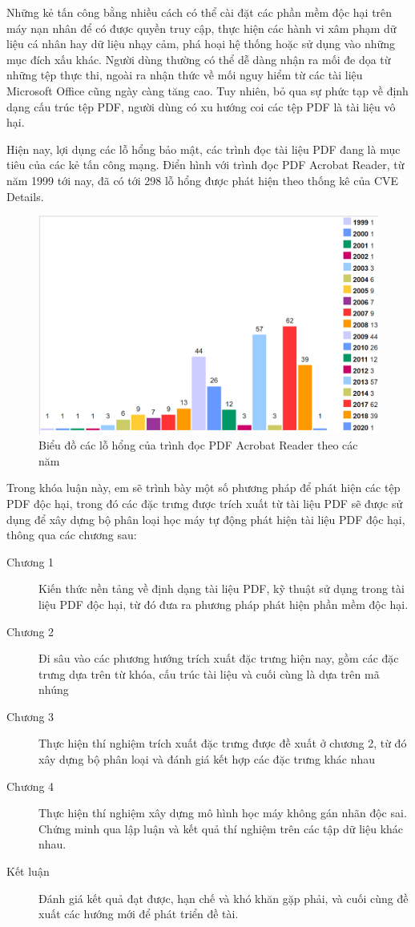 \documentclass[./../main.tex]{subfiles}
\begin{document}
Những kẻ tấn công bằng nhiều cách có thể cài đặt các phần mềm độc hại trên máy nạn nhân để có được quyền truy cập, thực hiện các hành vi xâm phạm dữ liệu cá nhân hay dữ liệu nhạy cảm, phá hoại hệ thống hoặc sử dụng vào những mục đích xấu khác. Người dùng thường có thể dễ dàng nhận ra mối đe dọa từ những tệp thực thi, ngoài ra nhận thức về mối nguy hiểm từ các tài liệu Microsoft Office cũng ngày càng tăng cao. Tuy nhiên, bỏ qua sự phức tạp về định dạng cấu trúc tệp PDF, người dùng có xu hướng coi các tệp PDF là tài liệu vô hại.

Hiện nay, lợi dụng các lỗ hổng bảo mật, các trình đọc tài liệu PDF đang là mục tiêu của các kẻ tấn công mạng. Điển hình với trình đọc PDF Acrobat Reader, từ năm 1999 tới nay, đã có tới 298 lỗ hổng được phát hiện theo thống kê của CVE Details.
\begin{figure}[ht!]
	\includegraphics[width=\linewidth]{./images/img2_acrobatcve.png}
	\caption{Biểu đồ các lỗ hổng của trình đọc PDF Acrobat Reader theo các năm}
	\label{fig:component}
\end{figure}


Trong khóa luận này, em sẽ trình bày một số phương pháp để phát hiện các tệp PDF độc hại, trong đó các đặc trưng được trích xuất từ tài liệu PDF sẽ được sử dụng để xây dựng bộ phân loại học máy tự động phát hiện tài liệu PDF độc hại, thông qua các chương sau:
\begin{description}
	\item [Chương 1] Kiến thức nền tảng về định dạng tài liệu PDF, kỹ thuật sử dụng trong tài liệu PDF độc hại, từ đó đưa ra phương pháp phát hiện phần mềm độc hại.
	\item [Chương 2] Đi sâu vào các phương hướng trích xuất đặc trưng hiện nay, gồm các đặc trưng dựa trên từ khóa, cấu trúc tài liệu và cuối cùng là dựa trên mã nhúng
	\item [Chương 3] Thực hiện thí nghiệm trích xuất đặc trưng được đề xuất ở chương 2, từ đó xây dựng bộ phân loại và đánh giá kết hợp các đặc trưng khác nhau
	\item [Chương 4] Thực hiện thí nghiệm xây dựng mô hình học máy không gán nhãn độc sai. Chứng minh qua lập luận và kết quả thí nghiệm trên các tập dữ liệu khác nhau.
	\item [Kết luận] Đánh giá kết quả đạt được, hạn chế và khó khăn gặp phải, và cuối cùng đề xuất các hướng mới để phát triển đề tài.
\end{description}
\end{document}
